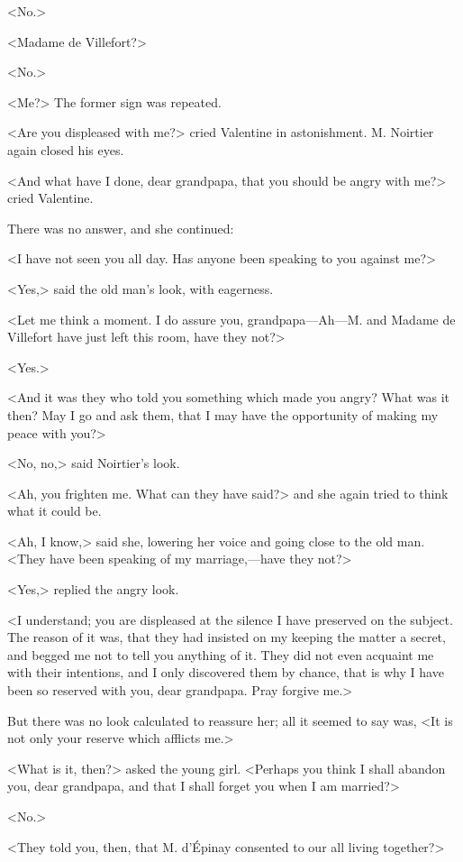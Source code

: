  <No.> 

 <Madame de Villefort?> 

 <No.> 

 <Me?> The former sign was repeated. 

 <Are you displeased with me?> cried Valentine in astonishment. M. Noirtier again closed his eyes. 

 <And what have I done, dear grandpapa, that you should be angry with me?> cried Valentine. 

 There was no answer, and she continued: 

 <I have not seen you all day. Has anyone been speaking to you against me?> 

 <Yes,> said the old man's look, with eagerness. 

 <Let me think a moment. I do assure you, grandpapa—Ah—M. and Madame de Villefort have just left this room, have they not?> 

 <Yes.> 

 <And it was they who told you something which made you angry? What was it then? May I go and ask them, that I may have the opportunity of making my peace with you?> 

 <No, no,> said Noirtier's look. 

 <Ah, you frighten me. What can they have said?> and she again tried to think what it could be. 

 <Ah, I know,> said she, lowering her voice and going close to the old man. <They have been speaking of my marriage,—have they not?> 

 <Yes,> replied the angry look. 

 <I understand; you are displeased at the silence I have preserved on the subject. The reason of it was, that they had insisted on my keeping the matter a secret, and begged me not to tell you anything of it. They did not even acquaint me with their intentions, and I only discovered them by chance, that is why I have been so reserved with you, dear grandpapa. Pray forgive me.> 

 But there was no look calculated to reassure her; all it seemed to say was, <It is not only your reserve which afflicts me.> 

 <What is it, then?> asked the young girl. <Perhaps you think I shall abandon you, dear grandpapa, and that I shall forget you when I am married?> 

 <No.> 

 <They told you, then, that M. d'Épinay consented to our all living together?> 

